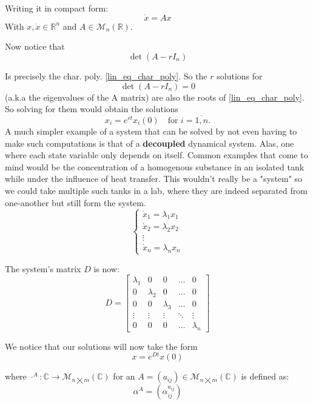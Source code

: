 Writing it in compact form:
\[
	\dot{x} = A x
\]
With $x, \dot{x} \in \mathbb{R}^n$ and $A \in \mathcal{M}_n(\mathbb{R})$.

Now notice that
\[
	\det (A- r I_n)
\]

Is precisely the char. poly. \ref{lin_eq_char_poly}. So the $r$ solutions for
\[
	\det (A - r I_n) =0
\]
(a.k.a the eigenvalues of the A matrix) are also the roots of \ref{lin_eq_char_poly}. So solving for them would obtain the solutions
\[
	x_i = e^{rt}x_i(0) \quad \text{for  } i = \overline{1,n}.
\]
A much simpler example of a system that can be solved by not even having to make such computations is that of a \textbf{decoupled} dynamical system. Alas, one where each state variable only depends on itself. Common examples that come to mind would be the concentration of a homogenous substance in an isolated tank while under the influence of heat transfer. This wouldn't really be a "system" so we could take multiple such tanks in a lab, where they are indeed separated from one-another but still form the system.
\begin{equation*}
	\begin{cases}
		\dot{x}_1 = \lambda_1 x_1 \\
		\dot{x}_2 = \lambda_2 x_2 \\
		\vdots                    \\
		\dot{x}_n = \lambda_n x_n
	\end{cases}
\end{equation*}

The system's matrix $D$ is now:
\begin{equation*}
	D =
	\begin{bmatrix}
		\lambda_1 & 0         & 0         & \dots  & 0         \\
		0         & \lambda_2 & 0         & \dots  & 0         \\
		0         & 0         & \lambda_3 & \dots  & 0         \\
		\vdots    & \vdots    & \vdots    & \ddots & \vdots    \\
		0         & 0         & 0         & \dots  & \lambda_n
	\end{bmatrix}
\end{equation*}

We notice that our solutions will now take the form
\[
	x = e^{Dt}x(0)
\]

where $\cdot^A : \mathbb{C} \rightarrow \mathcal{M}_{n \bigtimes m}(\mathbb{C})$ for an $A = (a_{ij}) \in \mathcal{M}_{n \bigtimes m}(\mathbb{C})$ is defined as:
\[
	\alpha^A = (\alpha^{a_{ij}}_{ij})
\]

